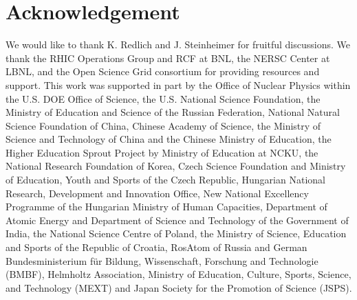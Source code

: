 \documentclass[aps,tightenlines,superscriptaddress,twocolumn]{revtex4-1}
\begin{document}
\section{Acknowledgement}
\label{acknowledgement}

We would like to thank K. Redlich and J. Steinheimer for fruitful discussions.
We thank the RHIC Operations Group and RCF at BNL, the NERSC Center at LBNL, and the Open Science Grid consortium for providing resources and support.  This work was supported in part by the Office of Nuclear Physics within the U.S. DOE Office of Science, the U.S. National Science Foundation, the Ministry of Education and Science of the Russian Federation, National Natural Science Foundation of China, Chinese Academy of Science, the Ministry of Science and Technology of China and the Chinese Ministry of Education, the Higher Education Sprout Project by Ministry of Education at NCKU, the National Research Foundation of Korea, Czech Science Foundation and Ministry of Education, Youth and Sports of the Czech Republic, Hungarian National Research, Development and Innovation Office, New National Excellency Programme of the Hungarian Ministry of Human Capacities, Department of Atomic Energy and Department of Science and Technology of the Government of India, the National Science Centre of Poland, the Ministry  of Science, Education and Sports of the Republic of Croatia, RosAtom of Russia and German Bundesministerium f\"ur Bildung, Wissenschaft, Forschung and Technologie (BMBF), Helmholtz Association, Ministry of Education, Culture, Sports, Science, and Technology (MEXT) and Japan Society for the Promotion of Science (JSPS).


\end{document}
